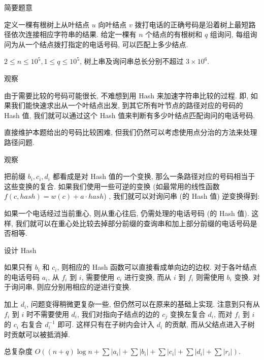 \begin{frame}{简要题意}
	
	定义一棵有根树上从叶结点 $u$ 向叶结点 $v$ 拨打电话的正确号码是沿着树上最短路径依次连接相应字符串的结果. 给定一棵有 $n$ 个结点的有根树和 $q$ 组询问, 每组询问为从一个结点拨打指定的电话号码, 可以匹配上多少结点. 

	$2\le n\le 10^5, 1\le q\le 10^5$, 树上串及询问串总长分别不超过 $3\times 10^6$.

\end{frame}

\begin{frame}{观察}
	
	由于需要比较的号码可能很长, 不难想到用 Hash 来加速字符串比较的过程. 即, 如果我们能快速求出从一个叶结点出发, 到其它所有叶节点的路径对应的号码的 Hash 值, 我们就可以通过这个 Hash 值来判断有多少叶结点匹配询问的电话号码. \pause

	直接维护本题给出的号码比较困难, 但我们仍然可以考虑使用点分治的方法来处理路径问题. \pause

\end{frame}

\begin{frame}{观察}

	把前缀 $b_i, c_i, d_i$ 都看成是对 Hash 值的一个变换, 那么一条路径对应的号码相当于这些变换的复合. 如果我们使用一些可逆的变换 (如最常用的线性函数 $f(c, hash) = w(c) + a\cdot hash$) , 我们就可以对询问串 (的 Hash 值) 逆变换得到: \pause

	如果一个电话经过当前重心, 则从重心往后, 仍需处理的电话号码 (的 Hash 值). 这样, 我们就可以在重心处比较去掉部分前缀的查询串和加上部分前缀的电话号码是否相等. 

\end{frame}

\begin{frame}{设计 Hash}
	
	如果只有 $b_i$ 和 $c_i$, 则相应的 Hash 函数可以直接看成单向边的边权. 对于各叶结点的电话号码 $a_i$, 从 $f_i$ 到 $i$, 需要使用 $c_i$ 进行变换, 而从 $i$ 到 $f_i$ 则需使用 $b_i$ 变换. 对于询问串, 则应分别用相应的逆进行变换. \pause

	加上 $d_i$, 问题变得稍微更复杂一些, 但仍然可以在原来的基础上实现. 注意到只有从 $f_i$ 到 $i$ 时不需要使用 $d_i$, 我们对指向子结点的边的 $c_j$ 变换左复合 $d_i$, 而对 $f_i$ 到 $i$ 的 $c_i$ 右复合 $d_i^{-1}$ 即可. 这样只有在子树内会计入 $d_i$ 的贡献, 而从父结点进入子树时贡献可以被抵消掉. \pause

	总复杂度 $O\left((n+q)\log n + \sum \left|a_i\right| + \sum \left|b_i\right|+ \sum \left|c_i\right|+ \sum \left|d_i\right|+ \sum \left|r_i\right|\right)$.

\end{frame}